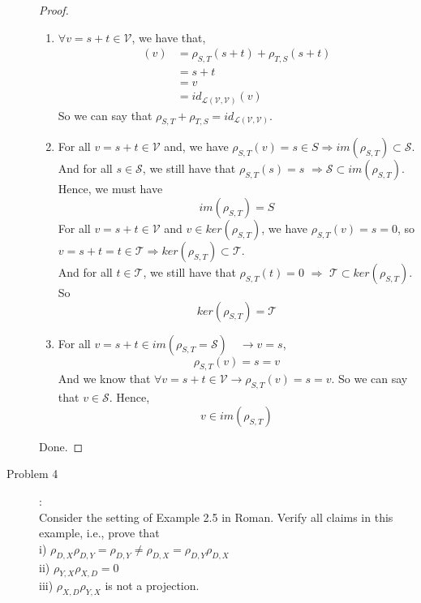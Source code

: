 \documentclass[a4paper]{article}
\begin{document}
\begin{description}
\begin{proof} \
  \begin{enumerate}[ i) ]
    \item $\forall v=s+t \in \mathcal{V}$, we have that,
    \begin{align*}
      [\rho_{S,T}+\rho_{T,S}](v)&=\rho_{S,T}(s+t)+\rho_{T,S}(s+t)\\
      &=s+t\\
      &=v\\
      &=id_{\mathcal{L(V,V)}}(v)
    \end{align*}
    So we can say that $\rho_{S,T} + \rho_{T,S} = id_\mathcal{L(V, V)}$.
    \item For all $v=s+t \in \mathcal{V}$ and, we have $\rho_{S,T}(v)=s\in S$\quad $\Rightarrow$\quad$im(\rho_{S,T})\subset \mathcal{S}$.\\
    And for all $s\in \mathcal{S}$, we still have that $\rho_{S,T}(s)=s$ \quad $\Rightarrow$\quad $\mathcal{S}\subset im(\rho_{S,T})$.\\
    Hence, we must have $$im(\rho_{S,T}) = S$$
    For all $v=s+t \in \mathcal{V}$ and $v\in ker(\rho_{S,T})$, we have $\rho_{S,T}(v)=s=0$, so $v=s+t=t \in \mathcal{T}$\quad $\Rightarrow$\quad $ker(\rho_{S,T})\subset \mathcal{T}$.\\
    And for all $t\in \mathcal{T}$, we still have that $\rho_{S,T}(t)=0$ \quad $\Rightarrow$ \quad $\mathcal{T}\subset ker(\rho_{S,T})$.\\
    So $$ker(\rho_{S,T})=\mathcal{T}$$
    \item For all $v=s+t\in im(\rho_{S,T}=\mathcal{S})\quad \to v=s$,$$\rho_{S,T}(v)=s=v$$
    And we know that $\forall v=s+t\in \mathcal{V} \to \rho_{S,T}(v)=s=v$. So we can say that $v\in \mathcal{S}$. Hence,
    $$v\in im(\rho_{S,T})$$
  \end{enumerate}
  Done.
\end{proof}

\item[Problem 4]:\\
Consider the setting of Example 2.5 in Roman. Verify all claims in this example, i.e., prove that\\
i) $\rho_{D,X}\rho_{D,Y} = \rho_{D,Y} \neq \rho_{D,X} = \rho_{D,Y} \rho_{D,X}$\\
ii) $\rho_{Y,X}\rho_{X,D} = 0$\\
iii) $\rho_{X,D}\rho_{Y,X}$ is not a projection.



\end{description}
\end{document}
